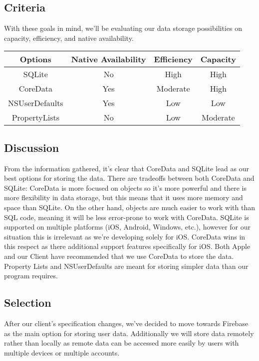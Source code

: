 \documentclass[letterpaper,10pt,titlepage]{article}
\begin{document}
\subsection{Criteria}

With these goals in mind, we'll be evaluating our data storage possibilities on capacity, efficiency, and native availability.\\

\begin{center}
\begin{tabular}{ |c|c|c|c| }
 \hline
 Options & Native Availability & Efficiency & Capacity \\ \hline
 SQLite & No & High & High \\ \hline
 CoreData & Yes & Moderate & High \\ \hline
 NSUserDefaults & Yes & Low & Low \\ \hline
 PropertyLists & No & Low & Moderate \\ \hline
\end{tabular}
\end{center}

\subsection{Discussion}

From the information gathered, it's clear that CoreData and SQLite lead as our best options for storing the data. There are tradeoffs between both CoreData and SQLite: CoreData is more focused on objects so it's more powerful and there is more flexibility in data storage, but this means that it uses more memory and space than SQLite. On the other hand, objects are much easier to work with than SQL code, meaning it will be less error-prone to work with CoreData. SQLite is supported on multiple platforms (iOS, Android, Windows, etc.), however for our situation this is irrelevant as we're developing solely for iOS. CoreData wins in this respect as there additional support features specifically for iOS. Both Apple and our Client have recommended that we use CoreData to store the data. Property Lists and NSUserDefaults are meant for storing simpler data than our program requires.

\subsection{Selection}

After our client's specification changes, we've decided to move towards Firebase as the main option for storing user data. Additionally we will store data remotely rather than locally as remote data can be accessed more easily by users with multiple devices or multiple accounts.
\end{document}
